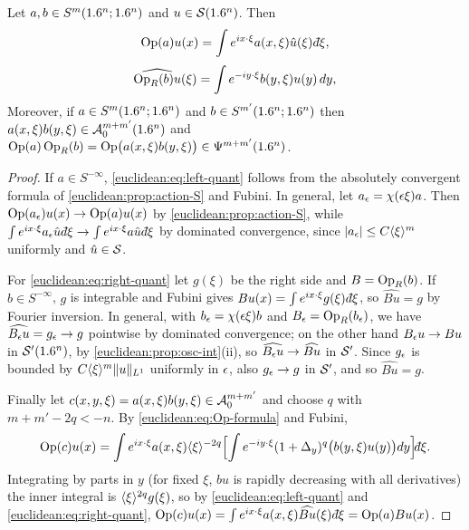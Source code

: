 \begin{proposition}\label{euclidean:prop:left-right}
  Let $a,b\in S^m(1.6^n;1.6^n)$ and $u\in\mathcal{S}(1.6^n)$. Then
  \begin{equation}\label{euclidean:eq:left-quant}
    \Op(a)u(x)=\int e^{ix\cdot\xi}a(x,\xi)\hat u(\xi)\,\dbar\xi,
  \end{equation}
  \begin{equation}\label{euclidean:eq:right-quant}
    \widehat{\operatorname{Op}_R(b)u}(\xi)=\int e^{-iy\cdot\xi}b(y,\xi)u(y)\,dy,
  \end{equation}
  Moreover, if $a\in S^m(1.6^n;1.6^n)$ and $b\in S^{m'}(1.6^n;1.6^n)$ then
  $a(x,\xi)b(y,\xi)\in\mathcal{A}^{m+m'}_{0}(1.6^n)$ and
  $\operatorname{Op}(a)\operatorname{Op}_R(b)=\operatorname{Op}\bigl(a(x,\xi)b(y,\xi)\bigr)\in\Psi^{m+m'}(1.6^n)$.
\end{proposition}
\begin{proof}
  If $a\in S^{-\infty}$, \eqref{euclidean:eq:left-quant} follows from the
  absolutely convergent formula of \cref{euclidean:prop:action-S} and Fubini.
  In general, let $a_\epsilon=\chi(\epsilon\xi)a$. Then $\operatorname{Op}(a_\epsilon)u(x)\to\operatorname{Op}(a)u(x)$
  by \cref{euclidean:prop:action-S}, while
  $\int e^{ix\cdot\xi}a_\eps\hat u\,\dbar\xi\to\int e^{ix\cdot\xi}a\hat u\,\dbar\xi$
  by dominated convergence, since $\lvert a_\epsilon\rvert\le C\langle \xi\rangle^m$ uniformly
  and $\hat u\in\mathcal{S}$.

  For \eqref{euclidean:eq:right-quant} let $g(\xi)$ be the right side and
  $B=\operatorname{Op}_R(b)$. If $b\in S^{-\infty}$, $g$ is integrable and Fubini gives
  $Bu(x)=\int e^{ix\cdot\xi}g(\xi)\,\dbar\xi$, so $\widehat{Bu}=g$ by Fourier
  inversion. In general, with $b_\epsilon=\chi(\epsilon\xi)b$ and $B_\epsilon=\operatorname{Op}_R(b_\epsilon)$,
  we have $\widehat{B_\epsilon u}=g_\epsilon\to g$ pointwise by dominated convergence;
  on the other hand $B_\epsilon u\to Bu$ in $\mathcal{S}'(1.6^n)$, by
  \cref{euclidean:prop:osc-int}(ii), so $\widehat{B_\epsilon u}\to\widehat{Bu}$
  in $\mathcal{S}'$. Since $g_\epsilon$ is bounded by $C\langle \xi\rangle^{m}\lVert u\rVert_{L^1}$
  uniformly in $\epsilon$, also $g_\epsilon\to g$ in $\mathcal{S}'$, and so $\widehat{Bu}=g$.

  Finally let $c(x,y,\xi)=a(x,\xi)b(y,\xi)\in\mathcal{A}^{m+m'}_{0}$ and choose $q$ with
  $m+m'-2q<-n$. By \eqref{euclidean:eq:Op-formula} and Fubini,
  \begin{equation*}
    \Op(c)u(x)=\int e^{ix\cdot\xi}a(x,\xi)\ang\xi^{-2q}
    \Bigl[\int e^{-iy\cdot\xi}(1+\Delta_y)^q\bigl(b(y,\xi)u(y)\bigr)dy\Bigr]\dbar\xi .
  \end{equation*}
  Integrating by parts in $y$ (for fixed $\xi$, $bu$ is rapidly decreasing
  with all derivatives) the inner integral is $\langle \xi\rangle^{2q}g(\xi)$, so by
  \eqref{euclidean:eq:left-quant} and \eqref{euclidean:eq:right-quant},
  $\Op(c)u(x)=\int e^{ix\cdot\xi}a(x,\xi)\widehat{Bu}(\xi)\,\dbar\xi=\Op(a)Bu(x)$.
\end{proof}

